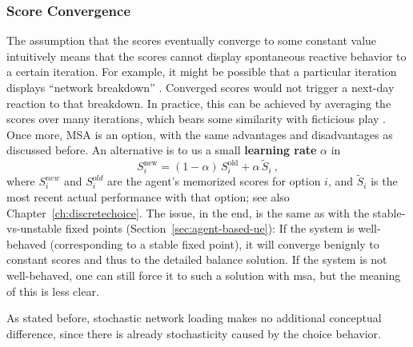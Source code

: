 \subsubsection{Score Convergence}
\label{sec:score-convergence}

The assumption that the scores
eventually converge to
some constant value intuitively means that the scores cannot display
spontaneous reactive behavior to a certain iteration.  For example, it
might be possible that a particular iteration displays ``network
breakdown'' \citep{RieserNagel2008NetworkBreakdown}.  Converged scores
would not trigger a next-day reaction to that breakdown.  In practice,
this can be achieved by averaging the scores over many iterations,
which bears some similarity with ficticious play 
\citep{monderer-1996, garcia-2000}.
Once more, MSA is an option, with the same advantages and
disadvantages as discussed before.  
An alternative is to us a small
\textbf{learning rate} $\alpha$ in
\begin{equation}
S_i^\text{new} = (1-\alpha) \, S_i^\text{old} + \alpha \, \tilde S_i \ ,
\end{equation}
where $S_i^{new}$ and $S_i^{old}$ are the agent's memorized scores for
option $i$, and $\tilde S_i$ is the most recent actual performance
with that option; see also Chapter~\ref{ch:discretechoice}.  
The issue, in the end, is the same as with the
stable-vs-unstable fixed points (\cf Section~\ref{sec:agent-based-ue}):
If the system is well-behaved (corresponding to a stable fixed point),
it will converge benignly to constant scores and thus to the detailed
balance solution.  If the system is not well-behaved, one can still
force it to such a solution with \gls{msa}, but the meaning of this is less
clear.

As stated before, stochastic network loading makes no additional
conceptual difference, since there is already stochasticity caused by
the choice behavior.


